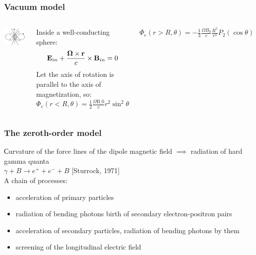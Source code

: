 \documentclass{beamer}
\begin{document}
\begin{frame}
\frametitle{Vacuum model}
\begin{columns}
\includegraphics[scale=0.22]{UWkNMChBQPQ.jpg}


Inside a well-conducting sphere:
$$\textbf{E}_{in} + \frac{\bf{\Omega} \times \bf{r}}{c} \times \textbf{B}_{in} = 0$$
Let the axis of rotation is parallel to the axis of magnetization, so:
\\ 


$\Phi_e(r < R, \theta) = \frac{1}{2}\frac{\Omega\text{B_0}}{c}r^2 \sin^2{\theta}$

$\Phi_e (r > R, \theta) = -\frac{1}{3}\frac{\Omega B_0}{c} \frac{R^5}{r^3} P_2( \cos{\theta})$
\end{columns}
\end{frame}



\begin{frame}
\frametitle{The zeroth-order model}
Сurvature of the force lines of the dipole magnetic field $\implies$ radiation of hard gamma quanta
\\

$\gamma + B \rightarrow e^{+} + e^{-} + B$ [Sturrock, 1971]
\\

A chain of processes:
\begin{itemize}
    \item acceleration of primary particles
    \item radiation of bending photons
    \itemthe birth of secondary electron-positron pairs
    \item acceleration of secondary particles, radiation of bending photons by them
    \item screening of the longitudinal electric field
\end{itemize}


\end{frame}
\end{document}
